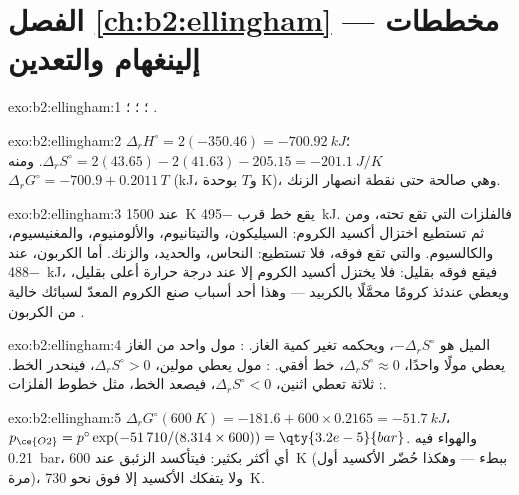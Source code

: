 \section*{الفصل \ref{ch:b2:ellingham} --- مخططات إلينغهام والتعدين}

\begin{solution}{exo:b2:ellingham:1}
؛ ؛ ؛
.
\end{solution}

\begin{solution}{exo:b2:ellingham:2}
$\Delta_r H^\circ = 2(-350.46) = \qty{-700.92}{kJ}$؛ $\Delta_r S^\circ = 2(43.65)
- 2(41.63) - 205.15 = \qty{-201.1}{J/K}$. ومنه $\Delta_r G^\circ = -700.9 +
0.2011\,T$ (\unit{kJ}، و$T$ بوحدة \unit{K})، وهي صالحة حتى نقطة انصهار الزنك.
\end{solution}

\begin{solution}{exo:b2:ellingham:3}
عند \qty{1500}{K} يقع خط  قرب \qty{-495}{kJ}. فالفلزات التي تقع تحته، ومن ثم
تستطيع اختزال أكسيد الكروم: السيليكون، والتيتانيوم، والألومنيوم، والمغنيسيوم،
والكالسيوم. والتي تقع فوقه، فلا تستطيع: النحاس، والحديد، والزنك. أما الكربون، عند \qty{-488}{kJ}، فيقع
فوقه بقليل: فلا يختزل أكسيد الكروم إلا عند درجة حرارة أعلى بقليل،
ويعطي عندئذ كرومًا محمَّلًا بالكربيد --- وهذا أحد أسباب صنع الكروم المعدّ
لسبائك خالية من الكربون .
\end{solution}

\begin{solution}{exo:b2:ellingham:4}
الميل هو $-\Delta_r S^\circ$، ويحكمه تغير كمية الغاز.
: مول واحد من الغاز يعطي مولًا واحدًا، $\Delta_r S^\circ \approx 0$،
خط أفقي. : مول يعطي مولين، $\Delta_r S^\circ > 0$، فينحدر
الخط. : ثلاثة تعطي اثنين، $\Delta_r S^\circ < 0$، فيصعد
الخط، مثل خطوط الفلزات.
\end{solution}

\begin{solution}{exo:b2:ellingham:5}
$\Delta_r G^\circ(\qty{600}{K}) = -181.6 + 600 \times 0.2165 = \qty{-51.7}{kJ}$،
$p_{\ce{O2}} = p^\circ\exp(-51\,710/(8.314 \times 600)) = \qty{3.2e-5}{bar}$. والهواء
فيه \qty{0.21}{bar}، أي أكثر بكثير: فيتأكسد الزئبق عند \qty{600}{K} (ببطء
--- وهكذا حُضّر الأكسيد أول مرة)، ولا يتفكك الأكسيد إلا
فوق نحو \qty{730}{K}.
\end{solution}


